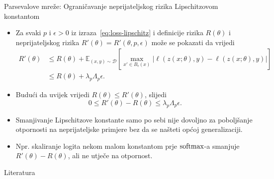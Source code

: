 \documentclass{beamer}
\begin{document}
\begin{frame}{Parsevalove mreže: Ograničavanje neprijateljskog rizika Lipschitzovom konstantom}
\begin{itemize}
	\item Za svaki $p$ i $\epsilon > 0$  iz izraza~\ref{eq:loss-lipschitz} i definicije rizika $R(\theta)$ i neprijateljskog rizika $R'(\theta)=R'(\theta,p,\epsilon)$ može se pokazati da vrijedi
	\begin{align}
	R'(\theta) 
	&\leq R(\theta) + \mathbb{E}_{(x,y)\sim\mathcal{D}}\left[
	\max_{x' \in B_\epsilon(x)} \lvert \ell(z(x;\theta),y)-\ell(z(x;\theta),y) \rvert \right] \\
	&\leq R(\theta) + \lambda_p\Lambda_p\epsilon.
	\end{align}
	\item Budući da uvijek vrijedi $R(\theta) \leq R'(\theta)$, slijedi
	\begin{equation}
	0 \leq R'(\theta)-R(\theta) \leq \lambda_p\Lambda_p\epsilon.
	\end{equation}
	\item Smanjivanje Lipschitzove konstante samo po sebi nije dovoljno za poboljšanje otpornosti na neprijateljske primjere bez da se našteti općoj generalizaciji.
	\item Npr. skaliranje logita nekom malom konstantom prje $\operatorname{softmax}$-a smanjuje $R'(\theta)-R(\theta)$, ali ne utječe na otpornost.
\end{itemize}
\end{frame}

\begin{frame}{Literatura}

\end{frame}
\end{document}
